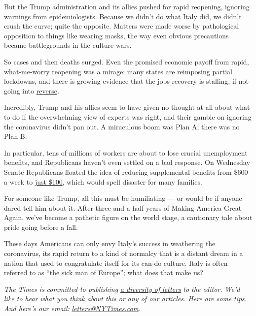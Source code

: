 But the Trump administration and its allies pushed for rapid reopening,
ignoring warnings from epidemiologists. Because we didn't do what Italy
did, we didn't crush the curve; quite the opposite. Matters were made
worse by pathological opposition to things like wearing masks, the way
even obvious precautions became battlegrounds in the culture wars.

So cases and then deaths surged. Even the promised economic payoff from
rapid, what-me-worry reopening was a mirage: many states are reimposing
partial lockdowns, and there is growing evidence that the jobs recovery
is stalling, if not going into
\href{https://twitter.com/bencasselman/status/1285964009326477315}{reverse}.

Incredibly, Trump and his allies seem to have given no thought at all
about what to do if the overwhelming view of experts was right, and
their gamble on ignoring the coronavirus didn't pan out. A miraculous
boom was Plan A; there was no Plan B.

In particular, tens of millions of workers are about to lose crucial
unemployment benefits, and Republicans haven't even settled on a bad
response. On Wednesday Senate Republicans floated the idea of reducing
supplemental benefits from \$600 a week to
\href{https://www.cnbc.com/2020/07/22/coronavirus-stimulus-republicans-consider-unemployment-insurance-extension.html}{just
\$100}, which would spell disaster for many families.

For someone like Trump, all this must be humiliating --- or would be if
anyone dared tell him about it. After three and a half years of Making
America Great Again, we've become a pathetic figure on the world stage,
a cautionary tale about pride going before a fall.

These days Americans can only envy Italy's success in weathering the
coronavirus, its rapid return to a kind of normalcy that is a distant
dream in a nation that used to congratulate itself for its can-do
culture. Italy is often referred to as ``the sick man of Europe''; what
does that make us?

\emph{The Times is committed to publishing}
\href{https://www.nytimes3xbfgragh.onion/2019/01/31/opinion/letters/letters-to-editor-new-york-times-women.html}{\emph{a
diversity of letters}} \emph{to the editor. We'd like to hear what you
think about this or any of our articles. Here are some}
\href{https://help.nytimes3xbfgragh.onion/hc/en-us/articles/115014925288-How-to-submit-a-letter-to-the-editor}{\emph{tips}}\emph{.
And here's our email:}
\href{mailto:letters@NYTimes.com}{\emph{letters@NYTimes.com}}\emph{.}

